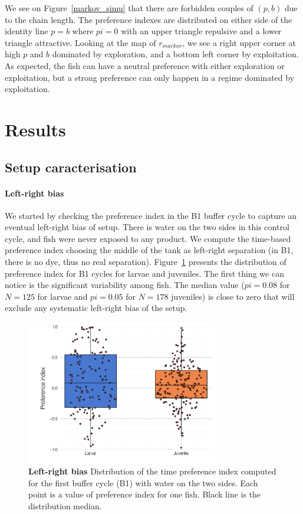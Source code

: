   We see on Figure~\ref{markov_simu} that there are forbidden couples of $(p,b)$ due to the chain length. The preference indexes are distributed on either side of the identity line $p=b$ where $pi = 0$ with an upper triangle repulsive and a lower triangle attractive. Looking at the map of $r_{markov}$, we see a right upper corner at high $p$ and $b$ dominated by exploration, and a bottom left corner by exploitation. As expected, the fish can have a neutral preference with either exploration or exploitation, but a strong preference can only happen in a regime dominated by exploitation.

  \section{Results}
  \subsection{Setup caracterisation}
  \paragraph{Left-right bias} We started by checking the preference index in the B1 buffer cycle to capture an eventual left-right bias of setup. There is water on the two sides in this control cycle, and fish were never exposed to any product. We compute the time-based preference index choosing the middle of the tank as left-right separation (in B1, there is no dye, thus no real separation). Figure~\ref{ld_bias} presents the distribution of preference index for B1 cycles for larvae and juveniles. The first thing we can notice is the significant variability among fish. The median value ($pi = 0.08$ for $N=125$ for larvae and $pi = 0.05$ for $N = 178$ juveniles) is close to zero that will exclude any systematic left-right bias of the setup.

    \begin{figure}[h]
      \centering
      \includegraphics[width=0.75\textwidth]{part_2/assets/ld_bias.png}
      \caption{\textbf{Left-right bias} Distribution of the time preference index computed for the first buffer cycle (B1) with water on the two sides. Each point is a value of preference index for one fish. Black line is the distribution median.}
      \label{ld_bias}
    \end{figure}

